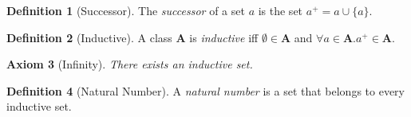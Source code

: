 \documentclass{article}
\newtheorem{axiom}{Axiom}
\theoremstyle{definition}
\newtheorem{definition}[axiom]{Definition}
\begin{document}
    \begin{definition}[Successor]
        The \emph{successor} of a set $a$ is the set $a^+ = a \cup \{ a \}$.
    \end{definition}

    \begin{definition}[Inductive]
        A class $\mathbf{A}$ is \emph{inductive} iff $\emptyset \in \mathbf{A}$ and
        $\forall a \in \mathbf{A}. a^+ \in \mathbf{A}$.
    \end{definition}

    \begin{axiom}[Infinity]
        There exists an inductive set.
    \end{axiom}

    \begin{definition}[Natural Number]
        A \emph{natural number} is a set that belongs to every inductive set.
    \end{definition}
\end{document}
